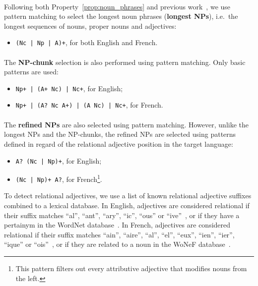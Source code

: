       \paragraph{}
      Following both Property~\ref{prop:noun_phrases} and previous
      work~\cite{hassan2010conundrums}, we use pattern matching to select the
      longest noun phrases (\textbf{longest NPs}), i.e.~the longest sequences of
      nouns, proper nouns and adjectives:
      \begin{itemize}
        \item{\texttt{(Nc | Np | A)+}, for both English and French.}
      \end{itemize}

      \paragraph{}
      The \textbf{NP-chunk} selection is also performed using pattern matching.
      Only basic patterns are used:
      \begin{itemize}
        \item{\texttt{Np+ |~(A+~Nc) |~Nc+}, for English;}
        \item{\texttt{Np+ |~(A?~Nc~A+) |~(A~Nc) |~Nc+}, for French.}
      \end{itemize}

      \paragraph{}
      The \textbf{refined NPs} are also selected using pattern matching.
      However, unlike the longest NPs and the NP-chunks, the refined NPs are
      selected using patterns defined in regard of the relational adjective
      position in the target language:
      \begin{itemize}
        \item{\texttt{A? (Nc~|~Np)+}, for English;}
        \item{\texttt{(Nc~|~Np)+ A?}, for French\footnote{This pattern filters
              out every attributive adjective that modifies nouns from the
              left.}.}
      \end{itemize}
      To detect relational adjectives, we use a list of known relational
      adjective suffixes combined to a lexical database. In English, adjectives
      are considered relational if their suffix matches ``al'', ``ant'',
      ``ary'', ``ic'', ``ous'' or
      ``ive''~\cite{grabar2006terminologystructuring}, or if they have a
      pertainym in the WordNet database~\cite{miller1995wordnet}. In French,
      adjectives are considered relational if their suffix matches ``ain'',
      ``aire'', ``al'', ``el'', ``eux'', ``ien'', ``ier'', ``ique'' or
      ``ois''~\cite{harastani2013relationaladjectivetranslation}, or if they are
      related to a noun in the WoNeF database~\cite{pradet2013wonef}.

